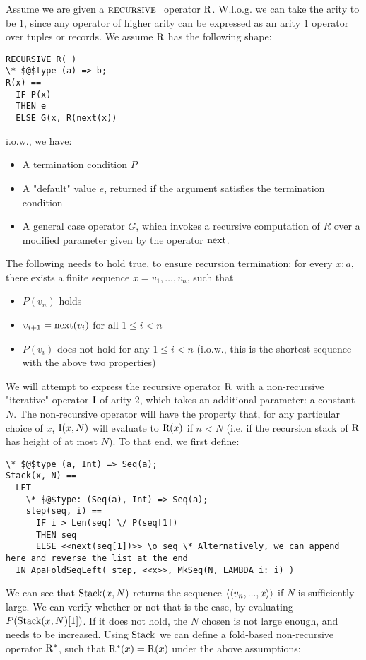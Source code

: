 Assume we are given a $\textsc{recursive }$ operator $\mathrm{R}$. W.l.o.g. we can take the arity to be $1$, since any operator of higher arity can be expressed as an arity $1$ operator over tuples or records.
We assume $\mathrm{R}$ has the following shape:
\begin{lstlisting}[language=tla,columns=fullflexible]
RECURSIVE R(_)
\* $@$type (a) => b;
R(x) ==
  IF P(x)
  THEN e
  ELSE G(x, R(next(x))
\end{lstlisting}
%
i.o.w., we have:
\begin{itemize}
  \item A termination condition $P$
  \item A "default" value $e$, returned if the argument satisfies the termination condition
  \item A general case operator $G$, which invokes a recursive computation of $R$ over a modified parameter given by the operator $\mathrm{next}$.
\end{itemize}
%
The following needs to hold true, to ensure recursion termination: for every $x\colon a$, there exists a finite sequence $x = v_1, \dots, v_n$, such that
\begin{itemize}
\item $P(v_n)$ holds
\item $v_{i+1} = \mathrm{next}(v_i)$ for all $1 \le i < n$
\item $P(v_i)$ does not hold for any $1 \le i < n$ (i.o.w., this is the shortest sequence with the above two properties)
\end{itemize}
%
We will attempt to express the recursive operator $\mathrm{R}$ with a non-recursive "iterative" operator $\mathrm{I}$ of arity $2$, which takes an additional parameter: a constant $N$. The non-recursive operator will have the property that, for any particular choice of $x$, $\mathrm{I}(x, N)$ will evaluate to $\mathrm{R}(x)$ if $n < N$ (i.e. if the recursion stack of $\mathrm{R}$ has height of at most $N$).
%
To that end, we first define:
\begin{lstlisting}[language=tla,columns=fullflexible]
\* $@$type (a, Int) => Seq(a);
Stack(x, N) ==
  LET 
    \* $@$type: (Seq(a), Int) => Seq(a);
    step(seq, i) ==
      IF i > Len(seq) \/ P(seq[1])
      THEN seq
      ELSE <<next(seq[1])>> \o seq \* Alternatively, we can append here and reverse the list at the end
  IN ApaFoldSeqLeft( step, <<x>>, MkSeq(N, LAMBDA i: i) )
\end{lstlisting}
%
We can see that $\mathrm{Stack}(x,N)$ returns the sequence $\left<\left<v_n, ..., x\right>\right>$ if $N$ is sufficiently large. We can verify whether or not that is the case, by evaluating $P(\mathrm{Stack}(x, N)[1])$. If it does not hold, the $N$ chosen is not large enough, and needs to be increased. Using $\mathrm{Stack}$ we can define a fold-based non-recursive operator $\mathrm{R}^*$, such that $\mathrm{R}^*(x) = \mathrm{R}(x)$ under the above assumptions:

